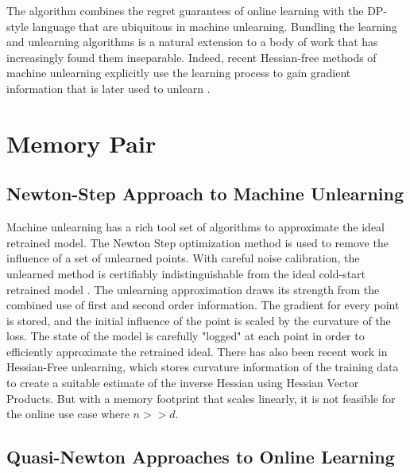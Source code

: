 \documentclass{article}
\theoremstyle{ssltheorem}
\begin{document}
The algorithm combines the regret guarantees of online learning with the DP-style language that are ubiquitous in machine unlearning.
Bundling the learning and unlearning algorithms is a natural extension to a body of work that has increasingly found them inseparable.
Indeed, recent Hessian-free methods of machine unlearning explicitly use the learning process to gain gradient information that is later used to unlearn \cite{qiao2024hessianfree}.
\section{Memory Pair}
\label{sec:memory-pair}

\subsection{Newton-Step Approach to Machine Unlearning}

Machine unlearning has a rich tool set of algorithms to approximate the ideal retrained model.
The Newton Step optimization method is used to remove the influence of a set of unlearned points.
With careful noise calibration, the unlearned method is certifiably indistinguishable from the ideal cold-start retrained model \cite{Sekhari_Acharya_Kamath_Suresh_2021-03}.
The unlearning approximation draws its strength from the combined use of first and second order information.
The gradient for every point is stored, and the initial influence of the point is scaled by the curvature of the loss.
The state of the model is carefully "logged" at each point in order to efficiently approximate the retrained ideal.
There has also been recent work in Hessian-Free unlearning, which stores curvature information of the training data to create a suitable estimate of the inverse Hessian using Hessian Vector Products.
But with a memory footprint that scales linearly, it is not feasible for the online use case where $n>>d$.
\subsection{Quasi-Newton Approaches to Online Learning}
\end{document}
